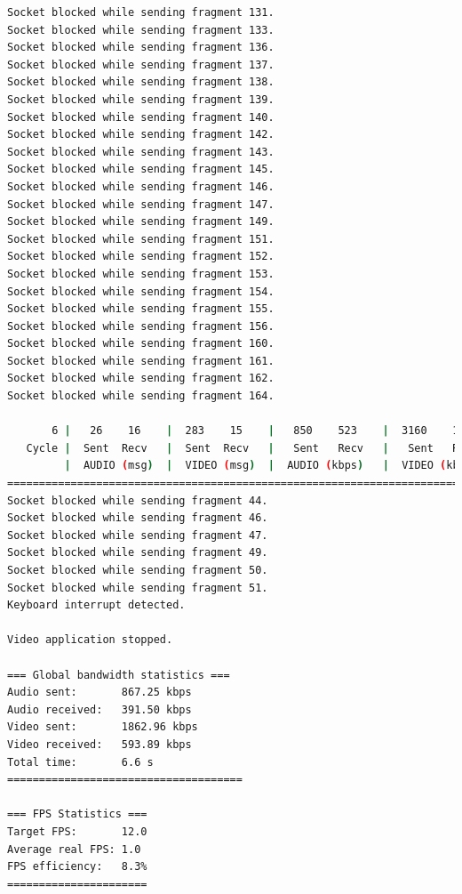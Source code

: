 \begin{lstlisting}[language=bash,basicstyle=\ttfamily\tiny]
Socket blocked while sending fragment 131.
Socket blocked while sending fragment 133.
Socket blocked while sending fragment 136.
Socket blocked while sending fragment 137.
Socket blocked while sending fragment 138.
Socket blocked while sending fragment 139.
Socket blocked while sending fragment 140.
Socket blocked while sending fragment 142.
Socket blocked while sending fragment 143.
Socket blocked while sending fragment 145.
Socket blocked while sending fragment 146.
Socket blocked while sending fragment 147.
Socket blocked while sending fragment 149.
Socket blocked while sending fragment 151.
Socket blocked while sending fragment 152.
Socket blocked while sending fragment 153.
Socket blocked while sending fragment 154.
Socket blocked while sending fragment 155.
Socket blocked while sending fragment 156.
Socket blocked while sending fragment 160.
Socket blocked while sending fragment 161.
Socket blocked while sending fragment 162.
Socket blocked while sending fragment 164.

       6 |   26    16    |  283    15    |   850    523    |  3160    167    |  22     69       
   Cycle |  Sent  Recv   |  Sent  Recv   |   Sent   Recv   |   Sent   Recv   | Program System
         |  AUDIO (msg)  |  VIDEO (msg)  |  AUDIO (kbps)   |  VIDEO (kbps)   |     CPU (%) 
===========================================================================================
Socket blocked while sending fragment 44.
Socket blocked while sending fragment 46.
Socket blocked while sending fragment 47.
Socket blocked while sending fragment 49.
Socket blocked while sending fragment 50.
Socket blocked while sending fragment 51.
Keyboard interrupt detected.

Video application stopped.

=== Global bandwidth statistics ===
Audio sent:       867.25 kbps
Audio received:   391.50 kbps
Video sent:       1862.96 kbps
Video received:   593.89 kbps
Total time:       6.6 s
=====================================

=== FPS Statistics ===
Target FPS:       12.0
Average real FPS: 1.0
FPS efficiency:   8.3%
======================
\end{lstlisting}

\newpage

